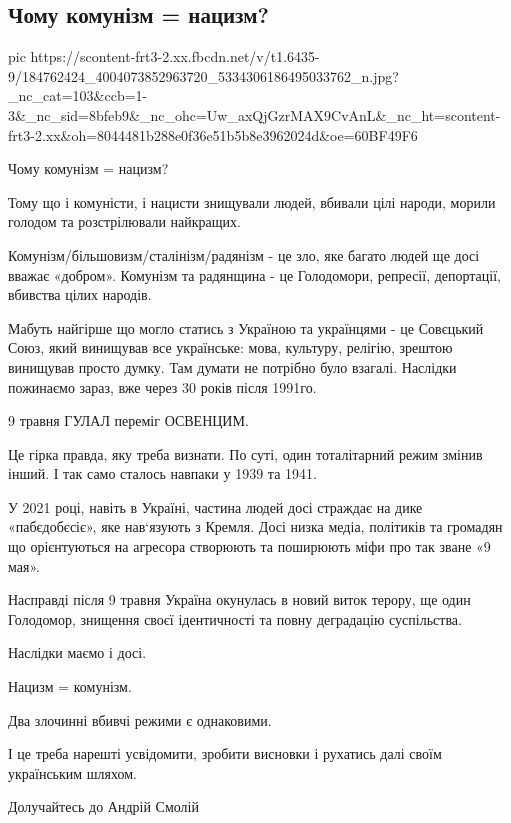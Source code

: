  
 
 
 
 
\subsection{Чому комунізм = нацизм?}


\ifcmt
  pic https://scontent-frt3-2.xx.fbcdn.net/v/t1.6435-9/184762424_4004073852963720_5334306186495033762_n.jpg?_nc_cat=103&ccb=1-3&_nc_sid=8bfeb9&_nc_ohc=Uw_axQjGzrMAX9CvAnL&_nc_ht=scontent-frt3-2.xx&oh=8044481b288e0f36e51b5b8e3962024d&oe=60BF49F6
\fi


Чому комунізм = нацизм? 

Тому що і комуністи, і нацисти знищували людей, вбивали цілі народи, морили
голодом та розстрілювали найкращих.

Комунізм/більшовизм/сталінізм/радянізм - це зло, яке багато людей ще досі
вважає «добром». Комунізм та радянщина - це Голодомори, репресії, депортації,
вбивства цілих народів.

Мабуть найгірше що могло статись з Україною та українцями - це Совєцький Союз,
який винищував все українське: мова, культуру, релігію, зрештою винищував
просто думку. Там думати не потрібно було взагалі. Наслідки пожинаємо зараз,
вже через 30 років після 1991го. 

9 травня ГУЛАЛ переміг ОСВЕНЦИМ. 

Це гірка правда, яку треба визнати. По суті, один тоталітарний режим змінив
інший. І так само сталось навпаки у 1939 та 1941. 

У 2021 році, навіть в Україні, частина людей досі страждає на дике
«пабєдобєсіє», яке нав‘язують з Кремля. Досі низка медіа, політиків та громадян
що орієнтуються на агресора створюють та поширюють міфи про так зване «9 мая».

Насправді після 9 травня Україна окунулась в новий виток терору, ще один
Голодомор, знищення своєї ідентичності та повну деградацію суспільства.

Наслідки маємо і досі.

Нацизм = комунізм. 

Два злочинні вбивчі режими є однаковими. 

І це треба нарешті усвідомити, зробити висновки і рухатись далі своїм українським шляхом.

Долучайтесь до Андрій Смолій
